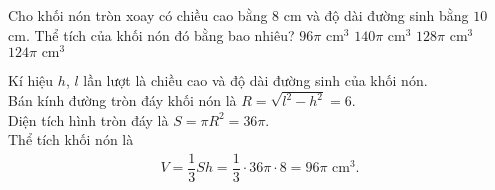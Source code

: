\begin{ex}%
 Cho khối nón tròn xoay có chiều cao bằng $8$ cm và độ dài đường sinh bằng $10$ cm. Thể tích của khối nón đó bằng bao nhiêu?
 \choice
  {\True $96 \pi \textrm{ cm}^3$}
  {$140 \pi \textrm{ cm}^3$}
  {$128 \pi \textrm{ cm}^3$}
  {$124 \pi \textrm{ cm}^3$}
 \loigiai
  {
  \immini
  {
  Kí hiệu $h$, $l$ lần lượt là chiều cao và độ dài đường sinh của khối nón.\\
  Bán kính đường tròn đáy khối nón là $R = \sqrt{l^2 - h^2} = 6$.\\
  Diện tích hình tròn đáy là $S = \pi R^2 = 36 \pi$.\\
  Thể tích khối nón là
  \begin{eqnarray*}
   V = \dfrac{1}{3} Sh = \dfrac{1}{3} \cdot 36 \pi \cdot 8 = 96 \pi \textrm{ cm}^3.
  \end{eqnarray*}
  }
  {
  }
  }
\end{ex}

